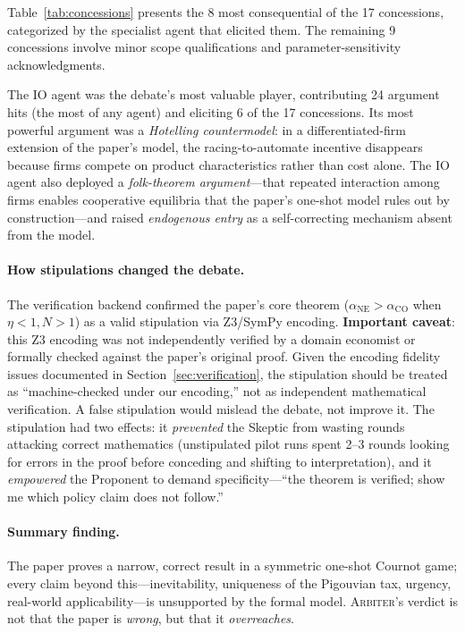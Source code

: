\documentclass[11pt]{article}
\newcommand{\arbiter}{\textsc{Arbiter}}
\begin{document}
Table~\ref{tab:concessions} presents the 8 most consequential of the 17 concessions, categorized by the specialist agent that elicited them.
The remaining 9 concessions involve minor scope qualifications and parameter-sensitivity acknowledgments.

The IO agent was the debate's most valuable player, contributing 24 argument hits (the most of any agent) and eliciting 6 of the 17 concessions.
Its most powerful argument was a \emph{Hotelling countermodel}: in a differentiated-firm extension of the paper's model, the racing-to-automate incentive disappears because firms compete on product characteristics rather than cost alone.
The IO agent also deployed a \emph{folk-theorem argument}---that repeated interaction among firms enables cooperative equilibria that the paper's one-shot model rules out by construction---and raised \emph{endogenous entry} as a self-correcting mechanism absent from the model.


\paragraph{How stipulations changed the debate.}
The verification backend confirmed the paper's core theorem ($\alpha_{\mathrm{NE}} > \alpha_{\mathrm{CO}}$ when $\eta < 1, N > 1$) as a valid stipulation via Z3/SymPy encoding. \textbf{Important caveat}: this Z3 encoding was not independently verified by a domain economist or formally checked against the paper's original proof. Given the encoding fidelity issues documented in Section~\ref{sec:verification}, the stipulation should be treated as ``machine-checked under our encoding,'' not as independent mathematical verification. A false stipulation would mislead the debate, not improve it. The stipulation had two effects: it \emph{prevented} the Skeptic from wasting rounds attacking correct mathematics (unstipulated pilot runs spent 2--3 rounds looking for errors in the proof before conceding and shifting to interpretation), and it \emph{empowered} the Proponent to demand specificity---``the theorem is verified; show me which policy claim does not follow.''

\paragraph{Summary finding.} The paper proves a narrow, correct result in a symmetric one-shot Cournot game; every claim beyond this---inevitability, uniqueness of the Pigouvian tax, urgency, real-world applicability---is unsupported by the formal model. \arbiter{}'s verdict is not that the paper is \emph{wrong}, but that it \emph{overreaches}.
\end{document}
